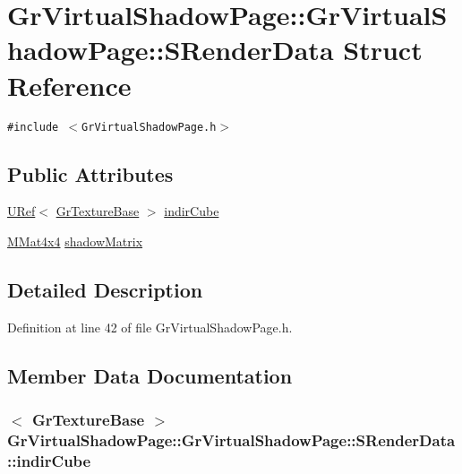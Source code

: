 \hypertarget{struct_gr_virtual_shadow_page_1_1_s_render_data}{
\section{GrVirtualShadowPage::GrVirtualShadowPage::SRenderData Struct Reference}
\label{struct_gr_virtual_shadow_page_1_1_s_render_data}
}
{\tt \#include $<$GrVirtualShadowPage.h$>$}

\subsection*{Public Attributes}
\begin{CompactItemize}
\item 
\hyperlink{class_u_ref}{URef}$<$ \hyperlink{class_gr_texture_base}{GrTextureBase} $>$ \hyperlink{struct_gr_virtual_shadow_page_1_1_s_render_data_31607d153b3771eaec764a6b64a67131}{indirCube}
\item 
\hyperlink{class_m_mat4x4}{MMat4x4} \hyperlink{struct_gr_virtual_shadow_page_1_1_s_render_data_fbc32f8ea7f4548ba9f2bd708dd7e333}{shadowMatrix}
\end{CompactItemize}


\subsection{Detailed Description}


Definition at line 42 of file GrVirtualShadowPage.h.

\subsection{Member Data Documentation}
\hypertarget{struct_gr_virtual_shadow_page_1_1_s_render_data_31607d153b3771eaec764a6b64a67131}{
\subsubsection[{indirCube}]{$<$ {\bf GrTextureBase} $>$ GrVirtualShadowPage::GrVirtualShadowPage::SRenderData::indirCube}}
\label{struct_gr_virtual_shadow_page_1_1_s_render_data_31607d153b3771eaec764a6b64a67131}




